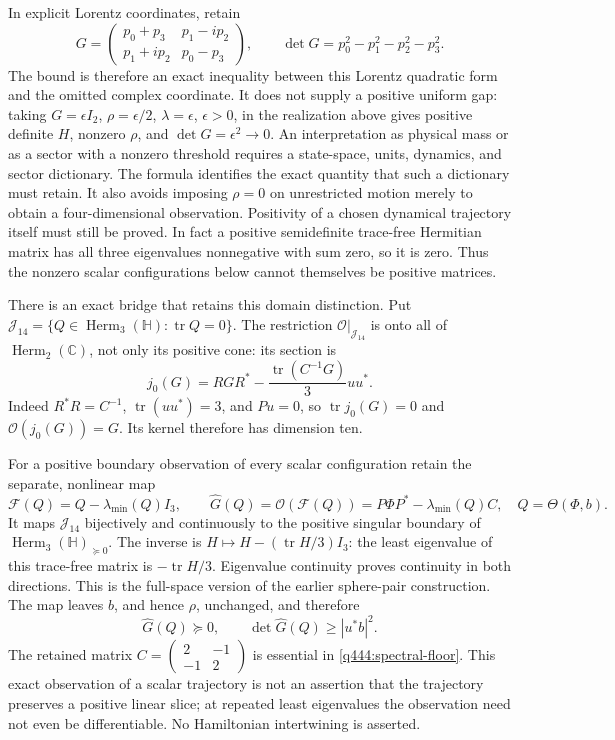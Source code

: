 In explicit Lorentz coordinates, retain
\[
 G=\begin{pmatrix}p_0+p_3&p_1-ip_2\\p_1+ip_2&p_0-p_3\end{pmatrix},
 \qquad \det G=p_0^2-p_1^2-p_2^2-p_3^2.
\]
The bound is therefore an exact inequality between this Lorentz quadratic
form and the omitted complex coordinate. It does not supply a positive
uniform gap: taking $G=\epsilon I_2$, $\rho=\epsilon/2$,
$\lambda=\epsilon$, $\epsilon>0$, in the realization above gives positive
definite $H$, nonzero $\rho$, and $\det G=\epsilon^2\to0$.
An interpretation as physical mass or as a sector with a nonzero threshold
requires a state-space, units, dynamics, and sector dictionary. The formula
identifies the exact quantity that such a dictionary must retain.
It also avoids imposing $\rho=0$ on unrestricted motion merely to obtain
a four-dimensional observation. Positivity of a chosen dynamical trajectory
itself must still be proved. In fact a positive semidefinite trace-free
Hermitian matrix has all three eigenvalues nonnegative with sum zero, so
it is zero. Thus the nonzero scalar configurations below cannot themselves
be positive matrices.

There is an exact bridge that retains this domain distinction. Put
$\mathcal J_{14}=\{Q\in\operatorname{Herm}_3(\mathbb H):\operatorname{tr}Q=0\}$.
The restriction $\mathscr O|_{\mathcal J_{14}}$ is onto all of
$\operatorname{Herm}_2(\mathbb C)$, not only its positive cone: its section is
\[
 j_0(G)=RGR^*-\frac{\operatorname{tr}(C^{-1}G)}3uu^*.
\]
Indeed $R^*R=C^{-1}$, $\operatorname{tr}(uu^*)=3$, and $Pu=0$,
so $\operatorname{tr}j_0(G)=0$ and $\mathscr O(j_0(G))=G$.
Its kernel therefore has dimension ten.

For a positive boundary observation of every scalar configuration retain
the separate, nonlinear map
\begin{equation}\label{q444:spectral-floor}
 \mathcal F(Q)=Q-\lambda_{\min}(Q)I_3,\qquad
 \widehat G(Q)=\mathscr O(\mathcal F(Q))
             =P\Phi P^*-\lambda_{\min}(Q)C,
 \quad Q=\Theta(\Phi,b).
\end{equation}
It maps $\mathcal J_{14}$ bijectively and continuously to the positive
singular boundary of $\operatorname{Herm}_3(\mathbb H)_{\succeq0}$.
The inverse is $H\mapsto H-(\operatorname{tr}H/3)I_3$: the least
eigenvalue of this trace-free matrix is $-\operatorname{tr}H/3$.
Eigenvalue continuity proves continuity in both directions. This is the
full-space version of the earlier sphere-pair construction. The map leaves
$b$, and hence $\rho$, unchanged, and therefore
\[
 \widehat G(Q)\succeq0,\qquad
 \det\widehat G(Q)\geq|u^*b|^2.
\]
The retained matrix $C=\left(\begin{smallmatrix}2&-1\\-1&2\end{smallmatrix}\right)$
is essential in \eqref{q444:spectral-floor}. This exact observation of a
scalar trajectory is not an assertion that the trajectory preserves a
positive linear slice; at repeated least eigenvalues the observation need
not even be differentiable. No Hamiltonian intertwining is asserted.

